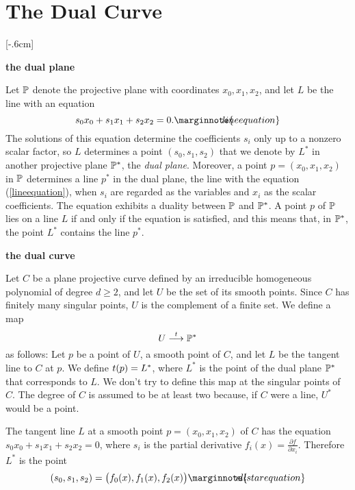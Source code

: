 \documentclass[leqno]{book}
\newcommand\Marginnote[1]{\marginnote{\hspace{-12pt}\normalfont{#1}}}
\renewcommand\theequation{\thesection.\arabic{equation}}
\newenvironment{boldequation}{\renewcommand\theequation{\textbf{\thesection.\arabic{equation}}}\equation}
   {\endequation}
\theoremstyle{definition}%
\numberwithin{equation}{section}
\theoremstyle{theorem} %
\begin{document}
 \section{The Dual Curve} \label{dualcurve}\Marginnote{dualcurve}[-.6cm]


\begin{boldequation}
\Marginnote{dualplanesect}\hspace{-10.5cm} \textbf {the dual plane}
	\label{dualplanesect} 
\end{boldequation}


 Let $\mathbb{P}$ denote the projective plane with coordinates
$x_0,x_1,x_2$, and let $L$ be the line with an equation
\begin{equation}s_0x_0+s_1x_1+s_2x_2 =0. \Marginnote{lineequation}  
\label{lineequation} \end{equation} 
The solutions of this equation determine the coefficients $s_i$ only
up to a nonzero scalar factor, so $L$ determines a point
$(s_0,s_1,s_2)$ that we denote by $L^*$ in another projective plane
$\mathbb{P}^*$, the {\it dual plane}.  Moreover, a point $p=(x_0,x_1,x_2)$ in
$\mathbb{P}$ determines a line $p^*$ in the dual plane, the line with the
equation (\ref{lineequation}), when $s_i$ are regarded as the
variables and $x_i$ as the scalar coefficients.  The equation exhibits
a duality between $\mathbb{P}$ and $\mathbb{P}^*$.  A point $p$ of $\mathbb{P}$ lies on
a line $L$ if and only if the equation is satisfied, and this means
that, in $\mathbb{P}^*$, the point $L^*$ contains the line $p^*$.

\begin{boldequation}
\Marginnote{dualcurvetwo}\hspace{-10.5cm} \textbf {the dual curve}
	\label{dualcurvetwo} 
\end{boldequation}

 Let $C$ be a plane projective curve defined by an irreducible
 homogeneous polynomial of degree $d\geq 2$, and let $U$ be the set of
 its smooth points.  Since $C$ has finitely many singular points, $U$
 is the complement of a finite set.  We define a
 map $$U\stackrel{t}{\longrightarrow}\mathbb{P}^*$$ as follows: Let $p$
 be a point of $U$, a smooth point of $C$, and let $L$ be the tangent
 line to $C$ at $p$.  We define $t(p)=L^*$, where $L^*$ is the
 point of the dual plane $\mathbb{P}^*$ that corresponds to $L$.  We don't
 try to define this map at the singular points of $C$.  The degree of
 $C$ is assumed to be at least two because, if $C$ were a line, $U^*$
 would be a point.

 The tangent line
$L$ at a smooth point $p = (x_0,x_1,x_2)$ of $C$ has the equation
$s_0x_0+s_1x_1+s_2x_2=0$, where $s_i$ is the partial derivative
$f_i(x) = \frac{\partial f}{\partial x_i}$.  Therefore $L^*$ is the
point
\begin{equation}(s_0,s_1,s_2) = \big(f_0(x),f_1(x),f_2(x)\big)
\Marginnote{ellstarequation}\label{ellstarequation}\end{equation} 
\end{document}
